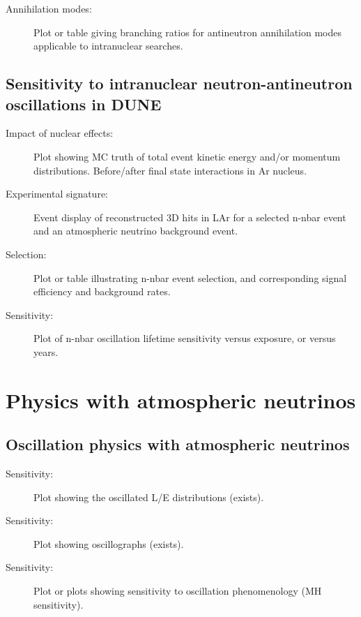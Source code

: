 \begin{description}
\item[Annihilation modes:] Plot or table giving branching ratios for antineutron annihilation modes applicable to intranuclear searches.
\end{description}


\subsection{Sensitivity to intranuclear neutron-antineutron oscillations in DUNE}
\label{subsec:nonaccel-nnbar-dunesensitivity}

\begin{description}
\item[Impact of nuclear effects:] Plot showing MC truth of total event kinetic energy and/or momentum distributions. Before/after final state interactions in Ar nucleus.
\item[Experimental signature:] Event display of reconstructed 3D hits in LAr for a selected n-nbar event and an atmospheric neutrino background event.
\item[Selection:] Plot or table illustrating n-nbar event selection, and corresponding signal efficiency and background rates.
\item[Sensitivity:] Plot of n-nbar oscillation lifetime sensitivity versus exposure, or versus years.
\end{description}


\section{Physics with atmospheric neutrinos}
\label{sec:nonaccel-atm}

\subsection{Oscillation physics with atmospheric neutrinos}
\label{sec:nonaccel-atm-oscillations}


\begin{description}
\item[Sensitivity:] Plot showing the oscillated L/E distributions (exists). 
\item[Sensitivity:] Plot showing oscillographs (exists). 
\item[Sensitivity:] Plot or plots showing sensitivity to oscillation phenomenology (MH sensitivity). 
\end{description}


